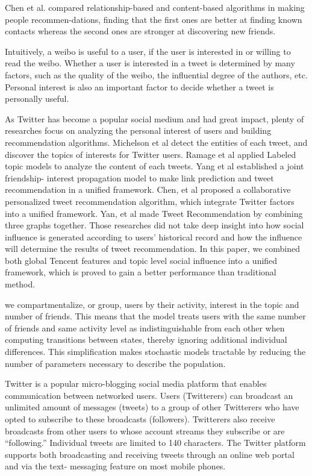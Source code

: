 \documentclass[twocolumn]{svjour3}          %
\begin{document}
Chen et al. \cite{sun2009novel} compared relationship-based and content-based algorithms in making people recommen-dations, finding that the first ones are better at finding known contacts whereas the second ones are stronger at discovering new friends.


Intuitively, a weibo is useful to a user, if the user is interested in or willing to read the weibo. Whether a user is interested in a tweet is determined by many factors, such as the quality of the weibo, the influential degree of the authors, etc. Personal interest is also an important factor to decide whether a tweet is personally useful.

As Twitter has become a popular social medium and had great impact, plenty of researches focus on analyzing the personal interest of users and building recommendation algorithms. Michelson et al \cite{michelson2010discovering} detect the entities of each tweet, and discover the topics of interests for Twitter users. Ramage et al \cite{ramage10microblogs} applied Labeled topic models to analyze the content of each tweets. Yang et al \cite{yang2011like} established a joint friendship- interest propagation model to make link prediction and tweet recommendation in a unified framework. Chen, et al \cite{chen2012collaborative} proposed a collaborative personalized tweet recommendation algorithm, which integrate Twitter factors into a unified framework. Yan, et al \cite{yan2012tweet} made Tweet Recommendation by combining three graphs together. Those researches did not take deep insight into how social influence is generated according to users’ historical record and how the influence will determine the results of tweet recommendation. In this paper, we combined both global Tencent features and topic level social influence into a unified framework, which is proved to gain a better performance than traditional method.

we compartmentalize, or group, users by their activity, interest in the topic and number of friends. This means that the model treats users with the same number of friends and same activity level as indistinguishable from each other when computing transitions between states, thereby ignoring additional individual differences. This simplification makes stochastic models tractable by reducing the number of parameters necessary to describe the population.

Twitter is a popular micro-blogging social media platform that enables communication between networked users. Users (Twitterers) can broadcast an unlimited amount of messages (tweets) to a group of other Twitterers who have opted to subscribe to these broadcasts (followers). Twitterers also receive broadcasts from other users to whose account streams they subscribe or are “following.” Individual tweets are limited to 140 characters. The Twitter platform supports both broadcasting and receiving tweets through an online web portal and via the text- messaging feature on most mobile phones.
\end{document}
